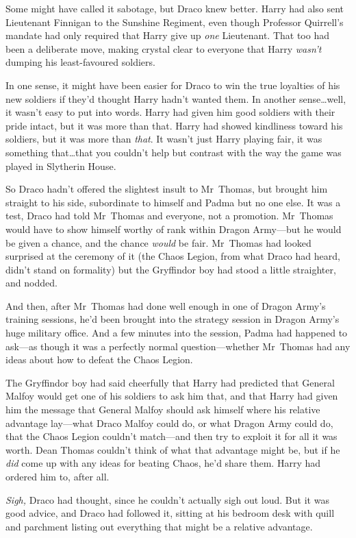 Some might have called it sabotage, but Draco knew better. Harry had also sent
Lieutenant Finnigan to the Sunshine Regiment, even though Professor Quirrell’s
mandate had only required that Harry give up \emph{one} Lieutenant. That too
had been a deliberate move, making crystal clear to everyone that Harry
\emph{wasn’t} dumping his least-favoured soldiers.

In one sense, it might have been easier for Draco to win the true loyalties of
his new soldiers if they’d thought Harry hadn’t wanted them. In another
sense…well, it wasn’t easy to put into words. Harry had given him good
soldiers with their pride intact, but it was more than that. Harry had showed
kindliness toward his soldiers, but it was more than \emph{that}. It wasn’t
just Harry playing fair, it was something that…that you couldn’t help
but contrast with the way the game was played in Slytherin House.

So Draco hadn’t offered the slightest insult to Mr~Thomas, but brought him
straight to his side, subordinate to himself and Padma but no one else. It was
a test, Draco had told Mr~Thomas and everyone, not a promotion. Mr~Thomas
would have to show himself worthy of rank within Dragon Army—but he would be
given a chance, and the chance \emph{would} be fair. Mr~Thomas had looked
surprised at the ceremony of it (the Chaos Legion, from what Draco had heard,
didn’t stand on formality) but the Gryffindor boy had stood a little
straighter, and nodded.

And then, after Mr~Thomas had done well enough in one of Dragon Army’s
training sessions, he’d been brought into the strategy session in Dragon Army’s
huge military office. And a few minutes into the session, Padma had happened to
ask—as though it was a perfectly normal question—whether Mr~Thomas had any
ideas about how to defeat the Chaos Legion.

The Gryffindor boy had said cheerfully that Harry had predicted that General
Malfoy would get one of his soldiers to ask him that, and that Harry had given
him the message that General Malfoy should ask himself where his relative
advantage lay—what Draco Malfoy could do, or what Dragon Army could do, that
the Chaos Legion couldn’t match—and then try to exploit it for all it was
worth. Dean Thomas couldn’t think of what that advantage might be, but if he
\emph{did} come up with any ideas for beating Chaos, he’d share them. Harry had
ordered him to, after all.

\emph{Sigh,} Draco had thought, since he couldn’t actually sigh out loud. But
it was good advice, and Draco had followed it, sitting at his bedroom desk with
quill and parchment listing out everything that might be a relative advantage.

